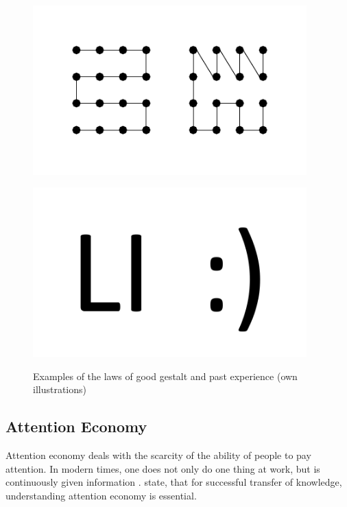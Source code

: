 \begin{enumerate}
    \begin{figure}[H] 
        \begin{minipage}[b]{.5\linewidth}
            \centering\includegraphics[width=0.94\textwidth]{img/gestalt.pdf}
            \label{fig:gest}
        \end{minipage}%
        \begin{minipage}[b]{.5\linewidth}
            \centering\includegraphics[width=0.94\textwidth]{img/experience.pdf}
            \label{fig:exo}
        \end{minipage}
        \caption[Laws of Good Gestalt and Past Experience]{Examples of the laws of good gestalt and past experience (own illustrations)}\label{fig:law4}
    \end{figure}
\end{enumerate}


\subsection{Attention Economy}
Attention economy deals with the scarcity of the ability of people to pay attention. In modern times, one does not only do one thing at work, but is continuously given information  \parencite[cf.][]{Davenport.2001}. \textcite{Davenport.2001} state, that for successful transfer of knowledge, understanding attention economy is essential. 

